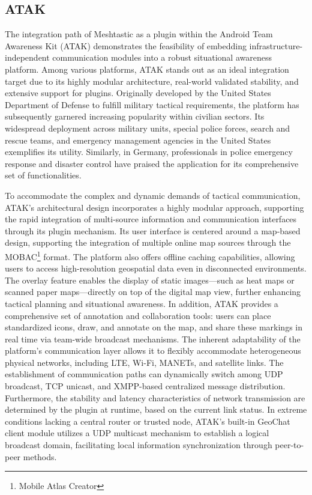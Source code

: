 \subsection{ATAK}
The integration path of Meshtastic as a plugin within the Android Team Awareness Kit (ATAK) demonstrates the feasibility of embedding infrastructure-independent communication modules into a robust situational awareness platform. Among various platforms, ATAK stands out as an ideal integration target due to its highly modular architecture, real-world validated stability, and extensive support for plugins. Originally developed by the United States Department of Defense to fulfill military tactical requirements, the platform has subsequently garnered increasing popularity within civilian sectors. Its widespread deployment across military units, special police forces, search and rescue teams, and emergency management agencies in the United States exemplifies its utility. Similarly, in Germany, professionals in police emergency response and disaster control have praised the application for its comprehensive set of functionalities.

To accommodate the complex and dynamic demands of tactical communication, ATAK's architectural design incorporates a highly modular approach, supporting the rapid integration of multi-source information and communication interfaces through its plugin mechanism.  Its user interface is centered around a map-based design, supporting the integration of multiple online map sources through the MOBAC\footnote{Mobile Atlas Creator} format. The platform also offers offline caching capabilities, allowing users to access high-resolution geospatial data even in disconnected environments. The overlay feature enables the display of static images—such as heat maps or scanned paper maps—directly on top of the digital map view, further enhancing tactical planning and situational awareness. In addition, ATAK provides a comprehensive set of annotation and collaboration tools: users can place standardized icons, draw, and annotate on the map, and share these markings in real time via team-wide broadcast mechanisms. The inherent adaptability of the platform's communication layer allows it to flexibly accommodate heterogeneous physical networks, including LTE, Wi-Fi, MANETs, and satellite links. The establishment of communication paths can dynamically switch among UDP broadcast, TCP unicast, and XMPP-based centralized message distribution. Furthermore, the stability and latency characteristics of network transmission are determined by the plugin at runtime, based on the current link status. In extreme conditions lacking a central router or trusted node, ATAK's built-in GeoChat client module utilizes a UDP multicast mechanism to establish a logical broadcast domain, facilitating local information synchronization through peer-to-peer methods.

